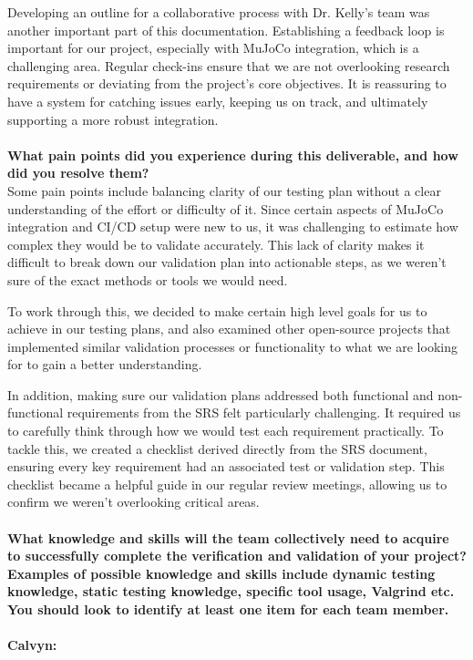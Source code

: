 \documentclass[12pt, titlepage]{article}
\begin{document}
Developing an outline for a collaborative process with Dr. Kelly’s team was another important part of this documentation. Establishing a feedback loop is important for our project, especially with MuJoCo integration, which is a challenging area. Regular check-ins ensure that we are not overlooking research requirements or deviating from the project’s core objectives. It is reassuring to have a system for catching issues early, keeping us on track, and ultimately supporting a more robust integration.
\\\\
\textbf{What pain points did you experience during this deliverable, and how did you resolve them?}\\

Some pain points include balancing clarity of our testing plan without a clear understanding of the effort or difficulty of it. Since certain aspects of MuJoCo integration and CI/CD setup were new to us, it was challenging to estimate how complex they would be to validate accurately. This lack of clarity makes it difficult to break down our validation plan into actionable steps, as we weren’t sure of the exact methods or tools we would need.

To work through this, we decided to make certain high level goals for us to achieve in our testing plans, and also examined other open-source projects that implemented similar validation processes or functionality to what we are looking for to gain a better understanding.

In addition, making sure our validation plans addressed both functional and non-functional requirements from the SRS felt particularly challenging. It required us to carefully think through how we would test each requirement practically. To tackle this, we created a checklist derived directly from the SRS document, ensuring every key requirement had an associated test or validation step. This checklist became a helpful guide in our regular review meetings, allowing us to confirm we weren’t overlooking critical areas.
\\\\
\textbf{What knowledge and skills will the team collectively need to acquire to
  successfully complete the verification and validation of your project?
  Examples of possible knowledge and skills include dynamic testing knowledge,
  static testing knowledge, specific tool usage, Valgrind etc.  You should look to identify at least one item for each team member.}
\\\\
    \textbf{Calvyn:}\\
    
\end{document}
